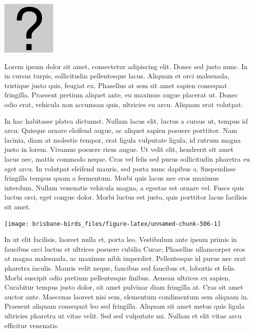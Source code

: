 \documentclass[]{book}
\let\origfigure\figure
\let\endorigfigure\endfigure
\renewenvironment{figure}[1][2] {
  \expandafter\origfigure\expandafter[H]
} {
  \endorigfigure
}
\begin{document}
\begin{figure}
\centering
\includegraphics{assets/missing.png}
\caption{No image for species}
\end{figure}

Lorem ipsum dolor sit amet, consectetur adipiscing elit. Donec sed justo
nunc. In in cursus turpis, sollicitudin pellentesque lacus. Aliquam et
orci malesuada, tristique justo quis, feugiat ex. Phasellus at sem sit
amet sapien consequat fringilla. Praesent pretium aliquet ante, eu
maximus augue placerat ut. Donec odio erat, vehicula non accumsan quis,
ultricies eu arcu. Aliquam erat volutpat.

In hac habitasse platea dictumst. Nullam lacus elit, luctus a cursus ut,
tempus id arcu. Quisque ornare eleifend augue, ac aliquet sapien posuere
porttitor. Nam lacinia, diam at molestie tempor, erat ligula vulputate
ligula, id rutrum magna justo in lorem. Vivamus posuere risus augue. Ut
velit elit, hendrerit sit amet lacus nec, mattis commodo neque. Cras vel
felis sed purus sollicitudin pharetra eu eget arcu. In volutpat eleifend
mauris, sed porta nunc dapibus a. Suspendisse fringilla tempus quam a
fermentum. Morbi quis lacus nec eros maximus interdum. Nullam venenatis
vehicula magna, a egestas est ornare vel. Fusce quis luctus orci, eget
congue dolor. Morbi luctus est justo, quis porttitor lacus facilisis sit
amet.

\begin{figure}
\texttt{[image: brisbane-birds\_files/figure-latex/unnamed-chunk-506-1]} \caption{insert figure caption}\label{fig:unnamed-chunk-506}
\end{figure}

In ut elit facilisis, laoreet nulla et, porta leo. Vestibulum ante ipsum
primis in faucibus orci luctus et ultrices posuere cubilia Curae;
Phasellus ullamcorper eros at magna malesuada, ac maximus nibh
imperdiet. Pellentesque id purus nec erat pharetra iaculis. Mauris velit
neque, faucibus sed faucibus et, lobortis et felis. Morbi suscipit odio
pretium pellentesque finibus. Aenean ultrices ex sapien. Curabitur
tempus justo dolor, sit amet pulvinar diam fringilla at. Cras sit amet
auctor ante. Maecenas laoreet nisi sem, elementum condimentum sem
aliquam in. Praesent aliquam consequat leo sed fringilla. Aliquam sit
amet metus quis ligula ultricies pharetra ut vitae velit. Sed sed
vulputate mi. Nullam et elit vitae arcu efficitur venenatis.
\end{document}

